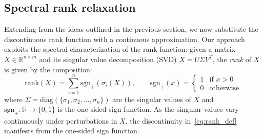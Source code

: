 \documentclass[10pt]{article}
\numberwithin{equation}{section}
\newcommand{\+}{%
	\raisebox{0.18ex}{\scaleobj{0.55}{+}}
}
\theoremstyle{definition}
\theoremstyle{definition}
\begin{document}
\subsection{Spectral rank relaxation}\label{sec:spectral_relax}
Extending from the ideas outlined in the previous section, we now substitute the discontinuous rank function with a continuous approximation. Our approach exploits the spectral characterization of the rank function: given a matrix $X \in \mathbb{R}^{n \times m}$ and its singular value decomposition (SVD) $X = U \Sigma V^T$, the \emph{rank} of $X$ is given by the composition:
\begin{equation}\label{eq:rank_def}
	\mathrm{rank}(X) = \sum\limits_{i=1}^{n} \mathrm{sgn}_+(\sigma_i(X)), \quad \quad \mathrm{sgn}_{+}(x) = \begin{cases}
		1 & \text{if } x > 0 \\
		0 & \text{otherwise}
	\end{cases}
\end{equation}
where $\Sigma = \mathrm{diag}(\{\sigma_1, \sigma_2, \dots, \sigma_n \})$ are the singular values  of $X$ and $\mathrm{sgn}_+: \mathbb{R} \to \{0, 1\}$ is the one-sided sign function. 
As the singular values vary continuously under perturbations in $X$, the discontinuity in~\eqref{eq:rank_def} manifests from the one-sided sign function. 
\end{document}
